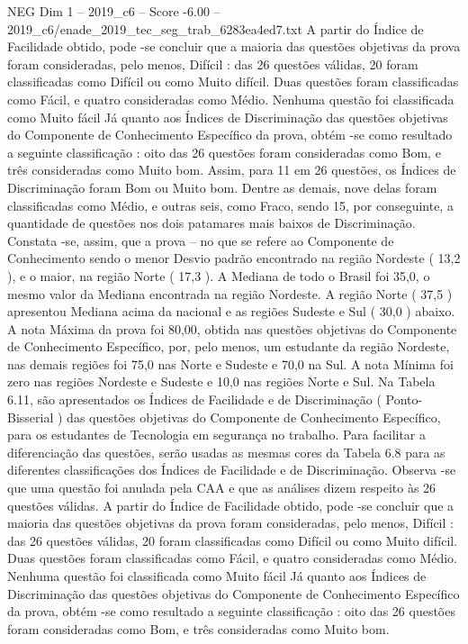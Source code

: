 \begin{textsample}{NEG Dim 1 – 2019\_c6 – Score -6.00 – 2019\_c6/enade\_2019\_tec\_seg\_trab\_6283ea4ed7.txt}
A partir do Índice de Facilidade obtido, pode -se concluir que a maioria das questões objetivas da prova foram consideradas, pelo menos, Difícil : das 26 questões válidas, 20 foram classificadas como Difícil ou como Muito difícil.
Duas questões foram classificadas como Fácil, e quatro consideradas como Médio.
Nenhuma questão foi classificada como Muito fácil Já quanto aos Índices de Discriminação das questões objetivas do Componente de Conhecimento Específico da prova, obtém -se como resultado a seguinte classificação : oito das 26 questões foram consideradas como Bom, e três consideradas como Muito bom.
Assim, para 11 em 26 questões, os Índices de Discriminação foram Bom ou Muito bom.
Dentre as demais, nove delas foram classificadas como Médio, e outras seis, como Fraco, sendo 15, por conseguinte, a quantidade de questões nos dois patamares mais baixos de Discriminação.
Constata -se, assim, que a prova – no que se refere ao Componente de Conhecimento sendo o menor Desvio padrão encontrado na região Nordeste ( 13,2 ), e o maior, na região Norte ( 17,3 ).
A Mediana de todo o Brasil foi 35,0, o mesmo valor da Mediana encontrada na região Nordeste.
A região Norte ( 37,5 ) apresentou Mediana acima da nacional e as regiões Sudeste e Sul ( 30,0 ) abaixo.
A nota Máxima da prova foi 80,00, obtida nas questões objetivas do Componente de Conhecimento Específico, por, pelo menos, um estudante da região Nordeste, nas demais regiões foi 75,0 nas Norte e Sudeste e 70,0 na Sul.
A nota Mínima foi zero nas regiões Nordeste e Sudeste e 10,0 nas regiões Norte e Sul.
Na Tabela 6.11, são apresentados os Índices de Facilidade e de Discriminação ( Ponto-Bisserial ) das questões objetivas do Componente de Conhecimento Específico, para os estudantes de Tecnologia em segurança no trabalho.
Para facilitar a diferenciação das questões, serão usadas as mesmas cores da Tabela 6.8 para as diferentes classificações dos Índices de Facilidade e de Discriminação.
Observa -se que uma questão foi anulada pela CAA e que as análises dizem respeito às 26 questões válidas.
A partir do Índice de Facilidade obtido, pode -se concluir que a maioria das questões objetivas da prova foram consideradas, pelo menos, Difícil : das 26 questões válidas, 20 foram classificadas como Difícil ou como Muito difícil.
Duas questões foram classificadas como Fácil, e quatro consideradas como Médio.
Nenhuma questão foi classificada como Muito fácil Já quanto aos Índices de Discriminação das questões objetivas do Componente de Conhecimento Específico da prova, obtém -se como resultado a seguinte classificação : oito das 26 questões foram consideradas como Bom, e três consideradas como Muito bom.

\end{textsample}
